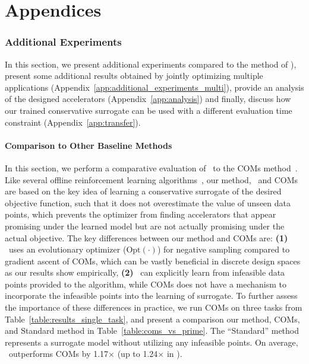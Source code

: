\appendix
\part*{Appendices}
%
\section{Additional Experiments}
In this section, we present additional experiments compared to the method of \citet{trabucco2021conservative}), present some additional results obtained by jointly optimizing multiple applications (Appendix~\ref{app:additional_experiments_multi}), provide an analysis of the designed accelerators (Appendix~\ref{app:analysis}) and finally, discuss how our trained conservative surrogate can be used with a different evaluation time constraint (Appendix~\ref{app:transfer}).

\subsection{Comparison to Other Baseline Methods}
\label{app:additional_experiments}
%
In this section, we perform a comparative evaluation of \primemethodname\ to the COMs method~\citep{trabucco2021conservative}. 
%
Like several offline reinforcement learning algorithms~\citep{kumar2020conservative}, our method, \primemethodname\, and COMs are based on the key idea of learning a conservative surrogate of the desired objective function, such that it does not overestimate the value of unseen data points, which prevents the optimizer from finding accelerators that appear promising under the learned model but are not actually promising under the actual objective. 
%
The key differences between our method and COMs are:
%
\textbf{(1)} \primemethodname\ uses an evolutionary optimizer ($\mathrm{Opt}(\cdot)$) for negative sampling compared to gradient ascent of COMs, which can be vastly beneficial in discrete design spaces as our results show empirically,
%
\textbf{(2)} \primemethodname\ can explicitly learn from infeasible data points provided to the algorithm, while COMs does not have a mechanism to incorporate the infeasible points into the learning of surrogate.
%
To further assess the importance of these differences in practice, we run COMs on three tasks from Table~\ref{table:results_single_task}, and present a comparison our method, COMs, and Standard method in Table~\ref{table:coms_vs_prime}.
%
The ``Standard'' method represents a surrogate model without utilizing any infeasible points.
%
On average, \primemethodname\ outperforms COMs by 1.17$\times$ (up to 1.24$\times$ in \msix).

